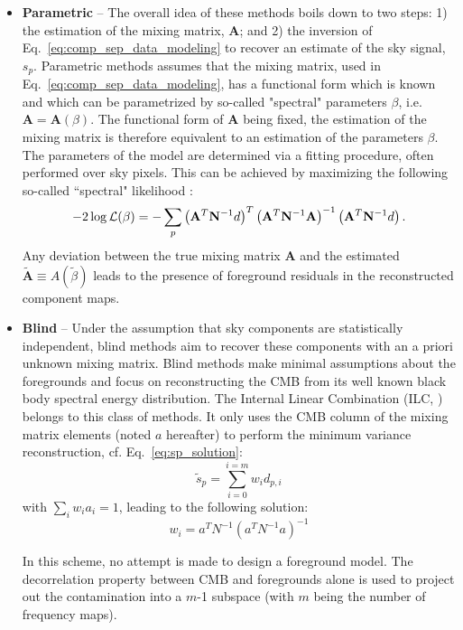 \begin{itemize}
	\item \textbf{Parametric} -- The overall idea of these methods boils down to two steps: 1) the estimation of the mixing matrix, $\mathbf{A}$; and 2) the inversion of Eq.~\ref{eq:comp_sep_data_modeling} to recover an estimate of the sky signal, $s_p$.
	Parametric methods assumes that the mixing matrix, used in Eq.~\ref{eq:comp_sep_data_modeling}, has a functional form which is known and which can be parametrized by so-called "spectral" parameters $\beta$, i.e. $\mathbf{A} = \mathbf{A}(\beta)$. The functional form of $\mathbf{A}$ being fixed, the estimation of the mixing matrix is therefore equivalent to an estimation of the parameters $\beta$. The parameters of the model are determined via a fitting procedure, often performed over sky pixels. This can be achieved by maximizing the following so-called ``spectral" likelihood \cite{brandt94,eriksen06}:
	\begin{eqnarray}
		\centering
			-2\log \mathcal{L}(\beta) = - \sum_p \left( \mathbf{A}^T\mathbf{N}^{-1} d\right)^T\left( \mathbf{A}^T\mathbf{N}^{-1} \mathbf{A}\right)^{-1}\left( \mathbf{A}^T\mathbf{N}^{-1} d\right).
	\end{eqnarray}
Any deviation between the true mixing matrix $\mathbf{A}$ and the estimated $\mathbf{\tilde A} \equiv A(\tilde \beta)$ leads to the presence of foreground residuals in the reconstructed component maps.
	\item \textbf{Blind} -- Under the  assumption that sky components are statistically independent, blind methods aim to recover these components with an a priori unknown mixing matrix. Blind methods make minimal assumptions about the foregrounds and focus on reconstructing the CMB from its well known black body spectral energy distribution. The Internal Linear Combination (ILC, \cite{tegmark03}) belongs to this class of methods. It only uses the CMB column of the mixing matrix elements (noted $a$ hereafter) to perform the minimum variance reconstruction, cf. Eq.~\ref{eq:sp_solution}:
\begin{equation}
  \tilde s_p = \sum_{i=0}^{i=m} w_i d_{p,i}
\end{equation}
with $\sum_i  w_i a_i = 1$, leading to the following solution:
\begin{equation}
  w_i = a^T N^{-1} (a^TN^{-1} a)^{-1}
\end{equation}

In this scheme, no attempt is made to design a foreground model. The decorrelation property between CMB and foregrounds alone is used to project out the contamination into a $m$-1 subspace (with $m$ being the number of frequency maps).


\end{itemize}
